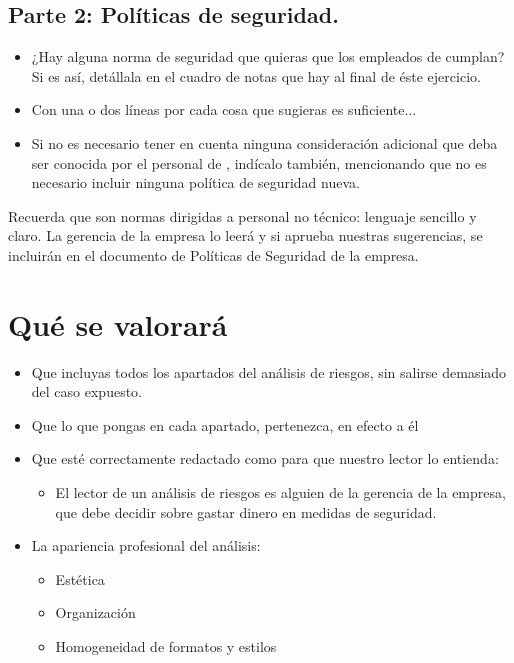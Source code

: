 \subsection{Parte 2: Políticas de seguridad.}


\begin{itemize}
\item ¿Hay alguna norma de seguridad que quieras que los empleados de {\nombreempresa} cumplan? Si es así, detállala en  el cuadro de notas que hay al final de éste ejercicio.
  
\item Con una o dos líneas por cada cosa que sugieras es   suficiente...
  
\item Si no es necesario tener en cuenta ninguna consideración adicional que deba ser conocida por el personal  de {\nombreempresa}, indícalo también, mencionando que no es necesario incluir ninguna política de seguridad nueva.
\end{itemize}

Recuerda que son normas dirigidas a personal no técnico: lenguaje sencillo y claro. La gerencia de la empresa lo leerá y si aprueba nuestras sugerencias, se incluirán en el documento de Políticas de Seguridad de la empresa.

\section{Qué se valorará}
\begin{itemize}
\item Que incluyas todos los apartados del análisis de riesgos, sin salirse demasiado del caso expuesto.
\item Que lo que pongas en cada apartado, pertenezca, en efecto a él
\item Que esté correctamente redactado como para que nuestro lector lo entienda:
  \begin{itemize}
  \item El lector de un análisis de riesgos es alguien de la gerencia de la empresa, que debe decidir sobre gastar dinero en medidas de seguridad.
  \end{itemize}
\item La apariencia profesional del análisis:
  \begin{itemize}
  \item Estética
  \item Organización
  \item Homogeneidad de formatos y estilos
  \end{itemize}
\end{itemize}

